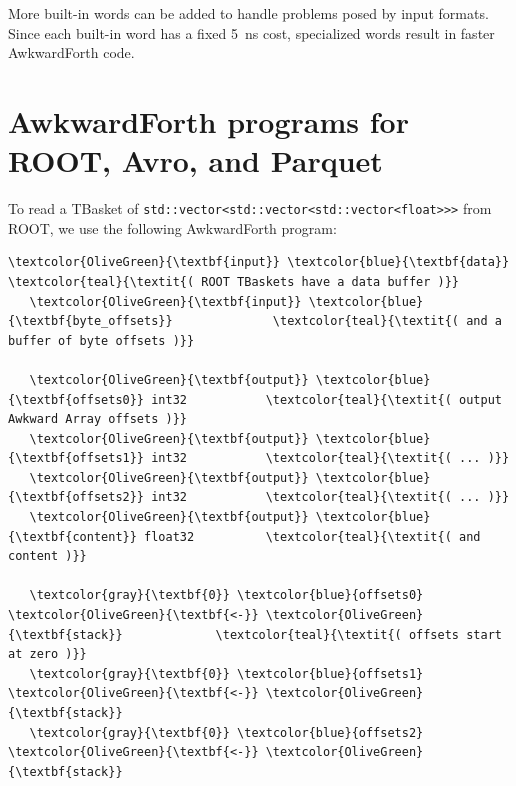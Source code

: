 \documentclass{webofc}
\begin{document}
More built-in words can be added to handle problems posed by input formats. Since each built-in word has a fixed 5~ns cost, specialized words result in faster AwkwardForth code.

\section{AwkwardForth programs for ROOT, Avro, and Parquet}
\label{sec:programs}

To read a TBasket of \texttt{std::vector<std::vector<std::vector<float>>>} from ROOT, we use the following AwkwardForth program:

\small
\begin{Verbatim}[commandchars=\\\{\}]
   \textcolor{OliveGreen}{\textbf{input}} \textcolor{blue}{\textbf{data}}                      \textcolor{teal}{\textit{( ROOT TBaskets have a data buffer )}}
   \textcolor{OliveGreen}{\textbf{input}} \textcolor{blue}{\textbf{byte_offsets}}              \textcolor{teal}{\textit{( and a buffer of byte offsets )}}

   \textcolor{OliveGreen}{\textbf{output}} \textcolor{blue}{\textbf{offsets0}} int32           \textcolor{teal}{\textit{( output Awkward Array offsets )}}
   \textcolor{OliveGreen}{\textbf{output}} \textcolor{blue}{\textbf{offsets1}} int32           \textcolor{teal}{\textit{( ... )}}
   \textcolor{OliveGreen}{\textbf{output}} \textcolor{blue}{\textbf{offsets2}} int32           \textcolor{teal}{\textit{( ... )}}
   \textcolor{OliveGreen}{\textbf{output}} \textcolor{blue}{\textbf{content}} float32          \textcolor{teal}{\textit{( and content )}}

   \textcolor{gray}{\textbf{0}} \textcolor{blue}{offsets0} \textcolor{OliveGreen}{\textbf{<-}} \textcolor{OliveGreen}{\textbf{stack}}             \textcolor{teal}{\textit{( offsets start at zero )}}
   \textcolor{gray}{\textbf{0}} \textcolor{blue}{offsets1} \textcolor{OliveGreen}{\textbf{<-}} \textcolor{OliveGreen}{\textbf{stack}}
   \textcolor{gray}{\textbf{0}} \textcolor{blue}{offsets2} \textcolor{OliveGreen}{\textbf{<-}} \textcolor{OliveGreen}{\textbf{stack}}


\end{Verbatim}
\end{document}
